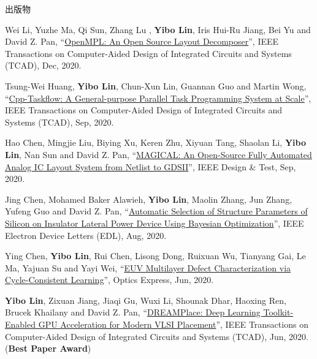 \begin{rSection}{出版物}
\begin{description}[font=\normalfont, rightmargin=2em]
{}
            

\item[{[J26]}]{
        Wei Li, Yuzhe Ma, Qi Sun,  Zhang Lu , \textbf{Yibo Lin}, Iris Hui-Ru Jiang, Bei Yu and David Z. Pan, 
    ``\href{https://doi.org/10.1109/TCAD.2020.3042175}{OpenMPL: An Open Source Layout Decomposer}'', 
    IEEE Transactions on Computer-Aided Design of Integrated Circuits and Systems (TCAD), Dec, 2020.
    
}
            

\item[{[J25]}]{
        Tsung-Wei Huang, \textbf{Yibo Lin}, Chun-Xun Lin, Guannan Guo and Martin Wong, 
    ``\href{https://doi.org/10.1109/TCAD.2021.3082507}{Cpp-Taskflow: A General-purpose Parallel Task Programming System at Scale}'', 
    IEEE Transactions on Computer-Aided Design of Integrated Circuits and Systems (TCAD), Sep, 2020.
    
}
            

\item[{[J24]}]{
        Hao Chen, Mingjie Liu, Biying Xu, Keren Zhu, Xiyuan Tang, Shaolan Li, \textbf{Yibo Lin}, Nan Sun and David Z. Pan, 
    ``\href{https://doi.org/10.1109/MDAT.2020.3024153}{MAGICAL: An Open-Source Fully Automated Analog IC Layout System from Netlist to GDSII}'', 
    IEEE Design \& Test, Sep, 2020.
    
}
            

\item[{[J23]}]{
        Jing Chen, Mohamed Baker Alawieh, \textbf{Yibo Lin}, Maolin Zhang, Jun Zhang, Yufeng Guo and David Z. Pan, 
    ``\href{https://doi.org/10.1109/LED.2020.3013571}{Automatic Selection of Structure Parameters of Silicon on Insulator Lateral Power Device Using Bayesian Optimization}'', 
    IEEE Electron Device Letters (EDL), Aug, 2020.
    
}
            

\item[{[J22]}]{
        Ying Chen, \textbf{Yibo Lin}, Rui Chen, Lisong Dong, Ruixuan Wu, Tianyang Gai, Le Ma, Yajuan Su and Yayi Wei, 
    ``\href{https://doi.org/10.1364/OE.394590}{EUV Multilayer Defect Characterization via Cycle-Consistent Learning}'', 
    Optics Express, Jun, 2020.
    
}
            

\item[{[J21]}]{
        \textbf{Yibo Lin}, Zixuan Jiang, Jiaqi Gu, Wuxi Li, Shounak Dhar, Haoxing Ren, Brucek Khailany and David Z. Pan, 
    ``\href{https://doi.org/10.1109/TCAD.2020.3003843}{DREAMPlace: Deep Learning Toolkit-Enabled GPU Acceleration for Modern VLSI Placement}'', 
    IEEE Transactions on Computer-Aided Design of Integrated Circuits and Systems (TCAD), Jun, 2020.
    (\textbf{Best Paper Award})
}
            


\end{description}
\end{rSection}
